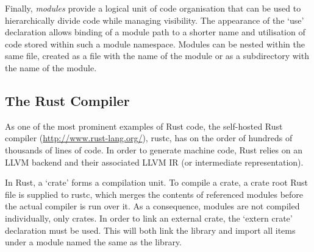 
Finally, \textit{modules} provide a logical unit of code organisation that can be used to hierarchically divide code while managing visibility. The appearance of the `use' declaration allows binding of a module path to a shorter name and utilisation of code stored within such a module namespace. Modules can be nested within the same file, created as a file with the name of the module or as a subdirectory with the name of the module.

\subsection{The Rust Compiler}

As one of the most prominent examples of Rust code, the self-hosted Rust compiler (\url{http://www.rust-lang.org/}), rustc, has on the order of hundreds of thousands of lines of code. In order to generate machine code, Rust relies on an LLVM backend and their associated LLVM IR (or intermediate representation).

In Rust, a `crate' forms a compilation unit. To compile a crate, a crate root Rust file is supplied to rustc, which merges the contents of referenced modules before the actual compiler is run over it. As a consequence, modules are not compiled individually, only crates. In order to link an external crate, the `extern crate' declaration must be used. This will both link the library and import all items under a module named the same as the library. 

